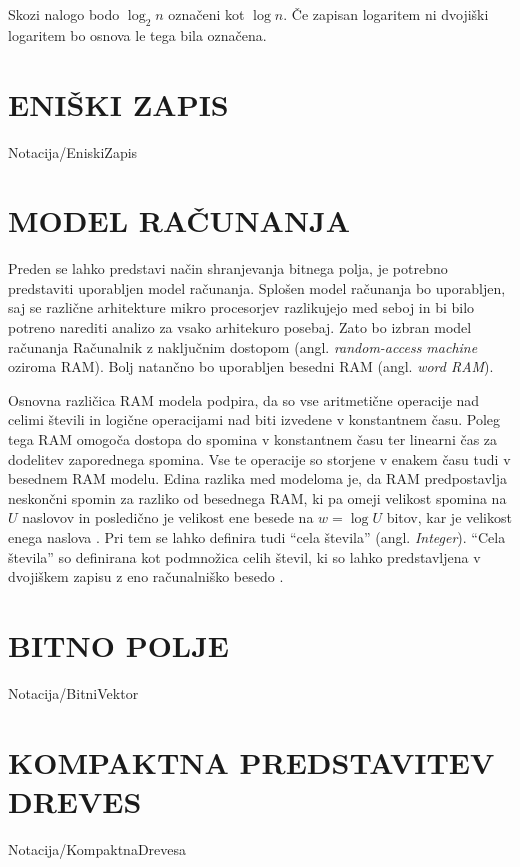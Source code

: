 Skozi nalogo bodo $\log_2{n}$ označeni kot $\log{n}$. Če zapisan logaritem ni dvojiški logaritem bo osnova le tega bila označena.


\section{ENIŠKI ZAPIS}\label{sec:Eniski_Zapis}
{Notacija/EniskiZapis}

\section{MODEL RAČUNANJA}\label{sec:Model_racunanja}
Preden se lahko predstavi način shranjevanja bitnega polja, je potrebno predstaviti uporabljen model računanja. Splošen model računanja bo uporabljen, saj se različne arhitekture mikro procesorjev razlikujejo med seboj in bi bilo potreno narediti analizo za vsako arhitekuro posebaj. Zato bo izbran model računanja Računalnik z naključnim dostopom (angl. \textit{random-access machine} oziroma RAM). Bolj natančno bo uporabljen besedni RAM  (angl. \textit{word RAM}).

Osnovna različica RAM modela podpira, da so vse aritmetične operacije nad celimi števili in logične operacijami nad biti izvedene v konstantnem času. Poleg tega RAM omogoča dostopa do spomina v konstantnem času ter linearni čas za dodelitev zaporednega spomina. Vse te operacije so storjene v enakem času tudi v besednem RAM modelu. Edina razlika med modeloma je, da RAM predpostavlja neskončni spomin za razliko od besednega RAM, ki pa omeji velikost spomina na $U$ naslovov in posledično je velikost ene besede na $w=\log{U}$ bitov, kar je velikost enega naslova \cite{Fredman1990,Morin2013,Navarro2016}. Pri tem se lahko definira tudi \enquote{cela števila} (angl. \textit{Integer}). \enquote{Cela števila} so definirana kot podmnožica celih števil, ki so lahko predstavljena v dvojiškem zapisu z eno računalniško besedo \cite{Navarro2016}.

\section{BITNO POLJE}\label{sec:Bitno_Polje}
{Notacija/BitniVektor}


\section{KOMPAKTNA PREDSTAVITEV DREVES}\label{sec:kompaktna_drevesa}
{Notacija/KompaktnaDrevesa}